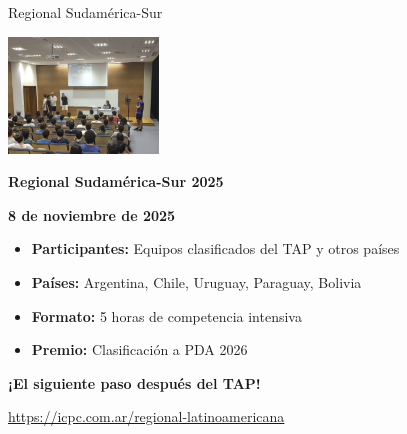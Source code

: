 \documentclass{beamer}
\begin{document}
\begin{frame}{Regional Sudamérica-Sur}
\begin{center}
\includegraphics[width=0.3\textwidth,keepaspectratio]{img/regional_logo.jpg}

\vspace{0.3cm}

\Large
\textbf{Regional Sudamérica-Sur 2025}

\vspace{0.2cm}

\normalsize
\textbf{8 de noviembre de 2025}

\vspace{0.2cm}

\begin{itemize}
\item \textbf{Participantes:} Equipos clasificados del TAP y otros países
\item \textbf{Países:} Argentina, Chile, Uruguay, Paraguay, Bolivia
\item \textbf{Formato:} 5 horas de competencia intensiva
\item \textbf{Premio:} Clasificación a PDA 2026
\end{itemize}

\vspace{0.2cm}

\textbf{¡El siguiente paso después del TAP!}

\vspace{0.1cm}

\small
\url{https://icpc.com.ar/regional-latinoamericana}
\end{center}
\end{frame}
\end{document}
